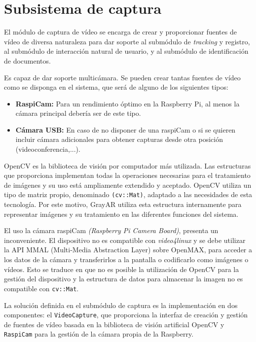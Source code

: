 \section{Subsistema de captura}
El módulo de captura de vídeo se encarga de crear y proporcionar fuentes de vídeo de diversa naturaleza para dar soporte al submódulo de \textit{tracking} y registro, al submódulo de interacción natural de usuario, y al submódulo de identificación de documentos.

Es capaz de dar soporte multicámara. Se pueden crear tantas fuentes de vídeo como se disponga en el sistema, que será de alguno de los siguientes tipos: 
\begin{itemize}
\item \textbf{RaspiCam:} Para un rendimiento óptimo en la Raspberry Pi, al menos la cámara principal debería ser de este tipo.
\item \textbf{Cámara USB:} En caso de no disponer de una raspiCam o si se quieren incluir cámara adicionales para obtener capturas desde otra posición (videoconferencia,...).
\end{itemize}

OpenCV es la biblioteca de visión por computador más utilizada. Las estructuras que proporciona implementan todas la operaciones necesarias para el tratamiento de imágenes y su uso está ampliamente extendido y aceptado. OpenCV utiliza un tipo de matriz propio, denominado \texttt{(cv::Mat)}, adaptado a las necesidades de esta tecnología. Por este motivo, GrayAR utiliza esta estructura internamente para representar imágenes y su tratamiento en las diferentes funciones del sistema.

El uso la cámara raspiCam \textit{(Raspberry Pi Camera Board)}, presenta un inconveniente. El dispositivo no es compatible con \emph{video4linux} y se debe utilizar la API MMAL (Multi-Media Abstraction Layer) sobre OpenMAX, para acceder a los datos de la cámara y transferirlos a la pantalla o codificarlo como imágenes o vídeos. Esto se traduce en que no es posible la utilización de OpenCV para la gestión del dispositivo y la estructura de datos para almacenar la imagen no es compatible con \texttt{cv::Mat}.  


La solución definida en el submódulo de captura es la implementación en dos componentes: el \texttt{VideoCapture}, que proporciona la interfaz de creación y gestión de fuentes de vídeo basada en la biblioteca de visión artificial OpenCV y \texttt{RaspiCam} para la gestión de la cámara propia de la Raspberry.

